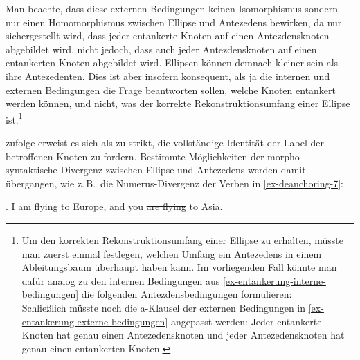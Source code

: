 Man beachte, dass diese externen Bedingungen keinen Isomorphismus sondern nur einen Homomorphismus zwischen Ellipse und Antezedens bewirken, da nur sichergestellt wird, dass jeder entankerte Knoten auf einen Antezdensknoten abgebildet wird, nicht jedoch, dass auch jeder Antezdensknoten auf einen entankerten Knoten abgebildet wird. Ellipsen können demnach kleiner sein als ihre Antezedenten. Dies ist aber insofern konsequent, als ja die internen und externen Bedingungen die Frage beantworten sollen, welche Knoten entankert werden können, und  nicht, was der korrekte Rekonstruktionsumfang einer Ellipse ist.\footnote{Um den korrekten Rekonstruktionsumfang einer Ellipse zu erhalten, müsste man zuerst einmal festlegen, welchen Umfang ein Antezedens in einem Ableitungsbaum überhaupt haben kann. Im vorliegenden Fall könnte man dafür analog zu den internen Bedingungen aus \ref{ex-entankerung-interne-bedingungen} die folgenden Antezdensbedingungen formulieren:\\
Schlie\ss lich müsste noch die a-Klausel der externen Bedingungen in \ref{ex-entankerung-externe-bedingungen} angepasst werden: Jeder entankerte Knoten hat genau einen Antezedensknoten und jeder Antezedensknoten hat genau einen entankerten Knoten.} 

\cite{Lichte:Kallmeyer:10} zufolge erweist es sich als zu strikt, die vollständige Identität der Label der betroffenen Knoten zu fordern. Bestimmte Möglichkeiten der morpho-syntaktische Divergenz zwischen Ellipse und Antezedens werden damit übergangen, wie z.\,B.\ die Numerus-Divergenz der Verben in \ref{ex-deanchoring-7}:  

\ex. \label{ex-deanchoring-7} I am flying to Europe, and you \sout{are flying} to Asia. \hfill \citep[(4)]{Osborne:08}

